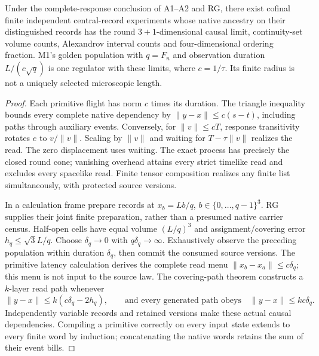 \begin{proposition}
\label{prop:record-gluing-sufficiency}
Under the complete-response conclusion of A1--A2 and RG, there exist
cofinal finite independent central-record experiments whose native ancestry
on their distinguished records has the round $3+1$-dimensional causal
limit, continuity-set volume counts, Alexandrov interval counts and
four-dimensional ordering fraction. M1's golden population with
$q=F_n$ and observation duration $L/(c\sqrt q)$ is one regulator with
these limits, where $c=1/\tau$. Its finite radius is not a uniquely
selected microscopic length.
\end{proposition}
\begin{proof}
Each primitive flight has norm $c$ times its duration. The triangle
inequality bounds every complete native dependency by
$\|y-x\|\leq c(s-t)$, including paths through auxiliary events.
Conversely, for $\|v\|\leq cT$, response transitivity rotates $e$ to
$v/\|v\|$. Scaling by $\|v\|$ and waiting for
$T-\tau\|v\|$ realizes the read. The zero displacement uses waiting.
The exact process has precisely the closed round cone; vanishing overhead
attains every strict timelike read and excludes every spacelike read.
Finite tensor composition realizes any finite list simultaneously, with
protected source versions.

In a calculation frame prepare records at
$x_b=Lb/q$, $b\in\{0,\ldots,q-1\}^3$. RG supplies their joint finite
preparation, rather than a presumed native carrier census. Half-open cells
have equal volume $(L/q)^3$ and assignment/covering error
$h_q\leq\sqrt3L/q$. Choose $\delta_q\to0$ with
$q\delta_q\to\infty$. Exhaustively observe the preceding population
within duration $\delta_q$, then commit the consumed source versions.
The primitive latency calculation derives the complete read menu
$\|x_b-x_a\|\leq c\delta_q$; this menu is not input to the source law.
The covering-path theorem constructs a $k$-layer read path whenever
\[
 \|y-x\|\leq k(c\delta_q-2h_q),
 \qquad
 \text{and every generated path obeys}\quad
 \|y-x\|\leq kc\delta_q.
\]
Independently variable records and retained versions make these actual
causal dependencies. Compiling a primitive correctly on every input state
extends to every finite word by induction; concatenating the native words
retains the sum of their event bills.


\end{proof}
